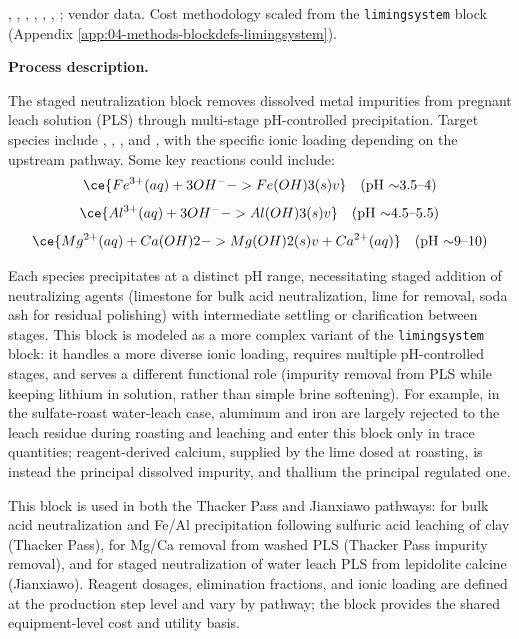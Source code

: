 \documentclass{article}
\renewcommand\_{\textunderscore\allowbreak}
\begin{document}
\citet{sgscanadaincSK1300Technical2024}, \citet{battagliaRecoveryLithiumCarbonate2022}, \citet{liuProcessAnalysisStudy2021}, \citet{dengSystematicReviewSulfate2026}, \citet{yanExtractionLithiumLepidolite2012}, \citet{ausimmMonograph27Cost}, \citet{petersPlantDesignEconomics1991}; vendor data. Cost methodology scaled from the \texttt{liming\_system} block (Appendix \ref{app:04-methods-blockdefs-limingsystem}).

\medskip
\noindent\textbf{Process description.}\quad

The staged neutralization block removes dissolved metal impurities from pregnant leach solution (PLS) through multi-stage pH-controlled precipitation. Target species include , , , and , with the specific ionic loading depending on the upstream pathway. Some key reactions could include:
\begin{equation}
	\ce{Fe^{3+}(aq) + 3OH^{-} -> Fe(OH)3(s) v} \quad\text{(pH $\sim$3.5--4)}
\end{equation}
\begin{equation}
	\ce{Al^{3+}(aq) + 3OH^{-} -> Al(OH)3(s) v} \quad\text{(pH $\sim$4.5--5.5)}
\end{equation}
\begin{equation}
	\ce{Mg^{2+}(aq) + Ca(OH)2 -> Mg(OH)2(s) v + Ca^{2+}(aq)} \quad\text{(pH $\sim$9--10)}
\end{equation}

Each species precipitates at a distinct pH range, necessitating staged addition of neutralizing agents (limestone for bulk acid neutralization, lime for  removal, soda ash for residual  polishing) with intermediate settling or clarification between stages. This block is modeled as a more complex variant of the \texttt{liming\_system} block: it handles a more diverse ionic loading, requires multiple pH-controlled stages, and serves a different functional role (impurity removal from PLS while keeping lithium in solution, rather than simple brine softening). For example, in the sulfate-roast water-leach case, aluminum and iron are largely rejected to the leach residue during roasting and leaching and enter this block only in trace quantities; reagent-derived calcium, supplied by the lime dosed at roasting, is instead the principal dissolved impurity, and thallium the principal regulated one.

This block is used in both the Thacker Pass and Jianxiawo pathways: for bulk acid neutralization and Fe/Al precipitation following sulfuric acid leaching of clay (Thacker Pass), for Mg/Ca removal from washed PLS (Thacker Pass impurity removal), and for staged neutralization of water leach PLS from lepidolite calcine (Jianxiawo). Reagent dosages, elimination fractions, and ionic loading are defined at the production step level and vary by pathway; the block provides the shared equipment-level cost and utility basis.
\end{document}
